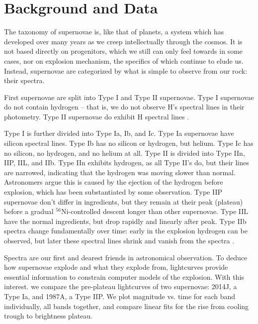 \section{Background and Data}
The taxonomy of supernovae is, like that of planets, a system which has developed over many years as we creep intellectually through the cosmos. It is not based directly on progenitors, which we still can only feel towards in some cases, nor on explosion mechanism, the specifics of which continue to elude us. Instead, supernovae are categorized by what is simple to observe from our rock: their spectra.

First supernovae are split into Type I and Type II supernovae. Type I supernovae do not contain hydrogen -- that is, we do not observe H's spectral lines in their photometry. Type II supernovae do exhibit H spectral lines \cite{villar2016}.

Type I is further divided into Type Ia, Ib, and Ic. Type Ia supernovae have silicon spectral lines. Type Ib has no silicon or hydrogen, but helium. Type Ic has no silicon, no hydrogen, and no helium at all. Type II is divided into Type IIn, IIP, IIL, and IIb. Type IIn exhibits hydrogen, as all Type II's do, but their lines are narrowed, indicating that the hydrogen was moving slower than normal. Astronomers argue this is caused by the ejection of the hydrogen before explosion, which has been substantiated by some observation. Type IIP supernovae don't differ in ingredients, but they remain at their peak (plateau) before a gradual $^56$Ni-controlled descent longer than other supernovae. Type IIL have the normal ingredients, but drop rapidly and linearly after peak. Type IIb spectra change fundamentally over time: early in the explosion hydrogen can be observed, but later these spectral lines shrink and vanish from the spectra \cite{villar2016}.

Spectra are our first and dearest friends in astronomical observation. To deduce how supernovae explode and what they explode from, lightcurves provide essential information to constrain computer models of the explosion. With this interest. we compare the pre-plateau lightcurves of two supernovae: 2014J, a Type Ia, and 1987A, a Type IIP. We plot magnitude vs. time for each band individually, all bands together, and compare linear fits for the rise from cooling trough to brightness plateau.
